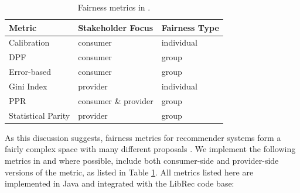 \begin{table}[tb]
\centering
\caption{Fairness metrics in \libauto.}
\label{tab:fair_metrics}
\begin{threeparttable}
\begin{tabular}{lll}
\toprule
Metric            & Stakeholder Focus     & Fairness Type \\\midrule
Calibration        & consumer             & individual \\
DPF                & consumer             & group \\
Error-based        & consumer             & group \\
Gini Index         & provider             & individual \\
PPR                & consumer \& provider & group \\
Statistical Parity & provider             & group \\
\bottomrule
                                 
\end{tabular}
\end{threeparttable}
\end{table}


As this discussion suggests, fairness metrics for recommender systems form a fairly complex space with many different proposals \cite{tsintzou2018bias,steck2018calibrated,beutel2019fairness,yao2017beyond,biega2018equity,castillo2019fairness,kuhlman2019fare,yang2017measuring}. We implement the following metrics in \libauto{} and where possible, include both consumer-side and provider-side versions of the metric, as listed in Table \ref{tab:fair_metrics}. All metrics listed here are implemented in Java and integrated with the LibRec code base: 

